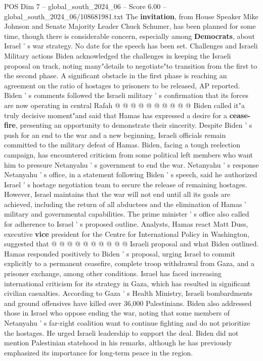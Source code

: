 \begin{textsample}{POS Dim 7 – global\_south\_2024\_06 – Score 6.00 – global\_south\_2024\_06/108681981.txt}
The \textbf{invitation}, from House Speaker Mike Johnson and Senate Majority Leader Chuck Schumer, has been planned for some time, though there is considerable concern, especially among \textbf{Democrats}, about Israel ' s war strategy.
No date for the speech has been set.
Challenges and Israeli Military actions Biden acknowledged the challenges in keeping the Israeli proposal on track, noting many"details to negotiate"to transition from the first to the second phase.
A significant obstacle in the first phase is reaching an agreement on the ratio of hostages to prisoners to be released, AP reported.
Biden ' s comments followed the Israeli military ' s confirmation that its forces are now operating in central Rafah @ @ @ @ @ @ @ @ @ @ Biden called it"a truly decisive moment"and said that Hamas has expressed a desire for a \textbf{cease-fire}, presenting an opportunity to demonstrate their sincerity.
Despite Biden ' s push for an end to the war and a new beginning, Israeli officials remain committed to the military defeat of Hamas.
Biden, facing a tough reelection campaign, has encountered criticism from some political left members who want him to pressure Netanyahu ' s government to end the war.
Netanyahu ' s response Netanyahu ' s office, in a statement following Biden ' s speech, said he authorized Israel ' s hostage negotiation team to secure the release of remaining hostages.
However, Israel maintains that the war will not end until all its goals are achieved, including the return of all abductees and the elimination of Hamas ' military and governmental capabilities.
The prime minister ' s office also called for adherence to Israel ' s proposed outline.
Analysts, Hamas react Matt Duss, executive \textbf{vice} president for the Centre for International Policy in Washington, suggested that @ @ @ @ @ @ @ @ @ @ Israeli proposal and what Biden outlined.
Hamas responded positively to Biden ' s proposal, urging Israel to commit explicitly to a permanent ceasefire, complete troop withdrawal from Gaza, and a prisoner exchange, among other conditions.
Israel has faced increasing international criticism for its strategy in Gaza, which has resulted in significant civilian casualties.
According to Gaza ' s Health Ministry, Israeli bombardments and ground offensives have killed over 36,000 Palestinians.
Biden also addressed those in Israel who oppose ending the war, noting that some members of Netanyahu ' s far-right coalition want to continue fighting and do not prioritize the hostages.
He urged Israeli leadership to support the deal.
Biden did not mention Palestinian statehood in his remarks, although he has previously emphasized its importance for long-term peace in the region.

\end{textsample}
